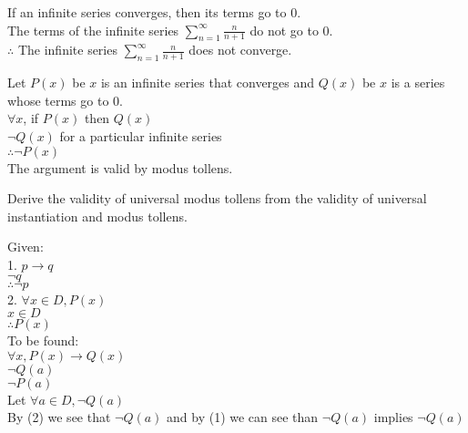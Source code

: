 \documentclass[12pt,letterpaper, onecolumn]{exam}
\begin{document}
\begin{questions}
		\setcounter{question}{17}\question If an infinite series converges, then its terms go to 0. \\
		The terms of the infinite series $\sum_{n=1}^{\infty} \frac{n}{n+1}$ do not go to 0.\\
		$\therefore$ The infinite series $\sum_{n=1}^{\infty} \frac{n}{n+1}$ does not converge.
		\begin{solution}
			Let $P(x)$ be $x$ is an infinite series that converges and $Q(x)$ be $x$ is a series whose terms go to 0.\\
			$\forall x$, if $P(x)$ then $Q(x)$\\
			$\neg Q(x)$ for a particular infinite series\\
			$\therefore \neg P(x)$\\
			The argument is valid by modus tollens.
		\end{solution}
		\setcounter{question}{34}\question Derive the validity of universal modus tollens from the validity of universal instantiation and modus tollens.
		\begin{solution}
			Given:\\
			1. $p \longrightarrow q$\\
			$\neg q$\\
			$\therefore \neg p$\\
			2. $\forall x \in D, P(x)$\\
			$x \in D$\\
			$\therefore P(x)$\\
			To be found:\\
			$\forall x, P(x) \longrightarrow Q(x)$\\
			$\neg Q(a)$\\
			$\neg P(a)$\\
			
			Let $\forall a \in D, \neg Q(a)$\\
			By (2) we see that $\neg Q(a)$ and by (1) we can see than $\neg Q(a)$ implies $\neg Q(a)$
			
		\end{solution}
	\end{questions}
\end{document}
